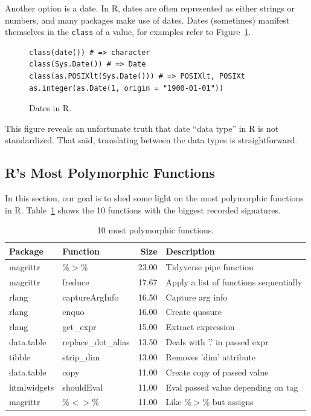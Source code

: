 \documentclass[acmsmall,10pt,review,anonymous]{acmart}\settopmatter{printfolios=true,printccs=false,printacmref=false}
\begin{document}
Another option is a date.
In R, dates are often represented as either strings or numbers, and many packages make use of dates.
Dates (sometimes) manifest themselves in the {\tt class} of a value, for examples refer to Figure~\ref{fig:date}.
\begin{figure}[!hb]{\small\begin{lstlisting}[style=R]
class(date()) # => character
class(Sys.Date()) # => Date
class(as.POSIXlt(Sys.Date())) # => POSIXlt, POSIXt
as.integer(as.Date(1, origin = "1900-01-01"))
\end{lstlisting}}\caption{Dates in R.}\label{fig:date}\end{figure}

This figure reveals an unfortunate truth that date ``data type'' in R is not standardized.
That said, translating between the data types is straightforward.

%
%
%
%
\subsection{R's Most Polymorphic Functions}

In this section, our goal is to shed some light on the most polymorphic functions in R.
Table~\ref{tab:bigpolyfuns} shows the 10 functions with the biggest recorded signatures.

\begin{table}[ht]
\label{tab:bigpolyfuns}
\centering
\begin{tabular}{llrl}
  \hline
Package & Function & Size & Description \\ 
  \hline
magrittr & \%$>$\% & 23.00 & Tidyverse pipe function \\ 
  magrittr & freduce & 17.67 & Apply a list of functions sequentially \\ 
  rlang & captureArgInfo & 16.50 & Capture arg info \\ 
  rlang & enquo & 16.00 & Create quosure \\ 
  rlang & get\_expr & 15.00 & Extract expression \\ 
  data.table & replace\_dot\_alias & 13.50 & Deals with '.' in passed expr \\ 
  tibble & strip\_dim & 13.00 & Removes 'dim' attribute \\ 
  data.table & copy & 11.00 & Create copy of passed value \\ 
  htmlwidgets & shouldEval & 11.00 & Eval passed value depending on tag \\ 
  magrittr & \%$<$$>$\% & 11.00 & Like \%$>$\% but assigns \\ 
   \hline
\end{tabular}
\caption{10 most polymorphic functions.}
\end{table}
\end{document}

